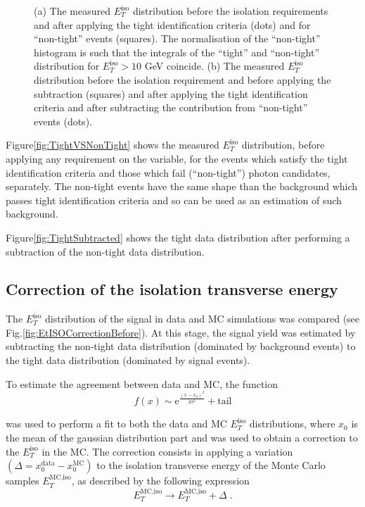 \documentclass[12pt, twoside]{article}
\numberwithin{equation}{section}
\numberwithin{figure}{section}
\begin{document}
\begin{figure}[h]
    \vspace{0.5cm}
    \captionsetup{width=0.9\textwidth}
    \caption{(a) The measured $E^{\text{iso}}_{T}$ distribution before the isolation requirements and after applying the tight identification criteria (dots) and for ``non-tight'' events (squares). The normalisation of the ``non-tight'' histogram is such that the integrals of the ``tight'' and ``non-tight'' distribution for $E^{\text{iso}}_{T} > 10$ GeV coincide. (b) The measured $E^{\text{iso}}_{T}$ distribution before the isolation requirement and before applying the subtraction (squares) and after applying the tight identification criteria and after subtracting the contribution from ``non-tight'' events (dots).}
    \label{fig:TightAndNonTightEvents}
\end{figure}

Figure\;\ref{fig:TightVSNonTight} shows the measured $E^{\text{iso}}_{T}$ distribution, before applying any requirement on the variable, for the events which satisfy the tight identification criteria and those which fail (``non-tight'') photon candidates, separately. The non-tight events have the same shape than the background which passes tight identification criteria and so can be used as an estimation of such background.

Figure\;\ref{fig:TightSubtracted} shows the tight data distribution after performing a subtraction of the non-tight data distribution.

\subsection{Correction of the isolation transverse energy}
\label{subsec:IsolationTransverseEnergyCorrection}

The $E^{\text{iso}}_{T}$ distribution of the signal in data and MC simulations was compared (see Fig.\ref{fig:EtISOCorrectionBefore}). At this stage, the signal yield was estimated by subtracting the non-tight data distribution (dominated by background events) to the tight data distribution (dominated by signal events).

To estimate the agreement between data and MC, the function
\begin{equation}    \label{eq:EtISOFit}
    f(x) \sim \mathrm{e}^{\frac{\left( x - x_{0} \right)^{2}}{2 \sigma^{2}}} + \text{tail}
\end{equation}

was used to perform a fit to both the data and MC $E^{\text{iso}}_{T}$ distributions, where $x_{0}$ is the mean of the gaussian distribution part and was used to obtain a correction to the $E^{\text{iso}}_{T}$ in the MC. The correction consists in applying a variation $\left( \Delta = x^{\text{data}}_{0} - x^{\text{MC}}_{0} \right)$ to the isolation transverse energy of the Monte Carlo samples $E^{\text{MC,iso}}_{T}$, as described by the following expression
\begin{equation}    \label{eq:EtISOCorrection}
    E^{\text{MC,iso}}_{T} \rightarrow E^{\text{MC,iso}}_{T} + \Delta \; .
\end{equation}
\end{document}
